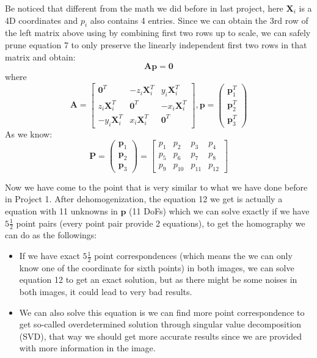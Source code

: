 \documentclass[conference]{IEEEtran}
\newcommand{\mat}[1]{\mathbf{#1}} %
\begin{document}
Be noticed that different from the math we did before in last project, here $\mat{X}_i$ is a 4D coordinates and $p_i$ also contains 4 entries. 
Since we can obtain the 3rd row of the left matrix above using by combining first two rows up to scale, we can safely prune equation 7 to only preserve the linearly independent first two rows in that matrix and obtain:
\begin{equation}
	\mat{A}
	\mat{p} = \mat{0}
\end{equation}
where
\begin{equation}
	\mat{A} = 
	\begin{bmatrix}
		\mat{0}^T & -z_i\mat{X}_i^T & y_i\mat{X}_i^T\\
		z_i\mat{X}_i^T & \mat{0}^T & -x_i\mat{X}_i^T\\
		-y_i\mat{X}_i^T & x_i\mat{X}_i^T & \mat{0}^T
	\end{bmatrix},
	\mat{p} = 
	\begin{pmatrix}
		\mat{p}_1^T\\
		\mat{p}_2^T\\
		\mat{p}_3^T
	\end{pmatrix}
\end{equation}
As we know:
\begin{equation}
	\mat{P} = 
	\begin{pmatrix}
		\mat{p}_1\\
		\mat{p}_2\\
		\mat{p}_3
	\end{pmatrix}
	=
	\begin{bmatrix}
		p_1 & p_2 & p_3 & p_4\\
		p_5 & p_6 & p_7 & p_8\\
		p_9 & p_{10} & p_{11} & p_{12}
	\end{bmatrix}
\end{equation}

Now we have come to the point that is very similar to what we have done before in Project 1. After dehomogenization, the equation 12 we get is actually a equation with 11 unknowns in $\mat{p}$ (11 DoFs) which we can solve exactly if we have $5\frac{1}{2}$ point pairs (every point pair provide 2 equations), to get the homography we can do as the followings:
\begin{itemize}
	\item If we have exact $5\frac{1}{2}$ point correspondences (which means the we can only know one of the coordinate for sixth points) in both images, we can solve equation 12 to get an exact solution, but as there might be some noises in both images, it could lead to very bad results.
	\item We can also solve this equation is we can find more point correspondence to get so-called overdetermined solution through singular value decomposition (SVD), that way we should get more accurate results since we are provided with more information in the image.
\end{itemize}
\end{document}
